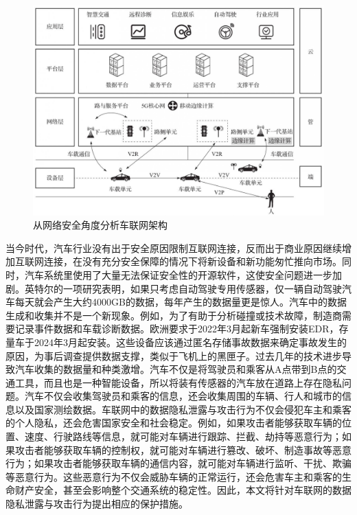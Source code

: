 \begin{figure}[htb]
    \centering
    \includegraphics[width=0.95 \textwidth]{figures/chapter1/chapter1.4.jpg}
    \caption{从网络安全角度分析车联网架构}
    \label{fig:Vehicle_networking_architecture}
\end{figure}

当今时代，汽车行业没有出于安全原因限制互联网连接，反而出于商业原因继续增加互联网连接，在没有充分安全保障的情况下将新设备和新功能匆忙推向市场。同时，汽车系统里使用了大量无法保证安全性的开源软件，这使安全问题进一步加剧。英特尔的一项研究表明，如果只考虑自动驾驶专用传感器，仅一辆自动驾驶汽车每天就会产生大约4000GB的数据，每年产生的数据量更是惊人。汽车中的数据生成和收集并不是一个新现象。例如，为了有助于分析碰撞或技术故障，制造商需要记录事件数据和车载诊断数据。欧洲要求于2022年3月起新车强制安装EDR，存量车于2024年3月起安装。这些设备应该通过匿名存储事故数据来确定事故发生的原因，为事后调查提供数据支撑，类似于飞机上的黑匣子。过去几年的技术进步导致汽车收集的数据量和种类激增。汽车不仅是将驾驶员和乘客从A点带到B点的交通工具，而且也是一种智能设备，所以将装有传感器的汽车放在道路上存在隐私问题。汽车不仅会收集驾驶员和乘客的信息，还会收集周围的车辆、行人和城市的信息以及国家测绘数据。车联网中的数据隐私泄露与攻击行为不仅会侵犯车主和乘客的个人隐私，还会危害国家安全和社会稳定。例如，如果攻击者能够获取车辆的位置、速度、行驶路线等信息，就可能对车辆进行跟踪、拦截、劫持等恶意行为；如果攻击者能够获取车辆的控制权，就可能对车辆进行篡改、破坏、制造事故等恶意行为；如果攻击者能够获取车辆的通信内容，就可能对车辆进行监听、干扰、欺骗等恶意行为。这些恶意行为不仅会威胁车辆的正常运行，还会危害车主和乘客的生命财产安全，甚至会影响整个交通系统的稳定性。因此，本文将针对车联网的数据隐私泄露与攻击行为提出相应的保护措施。

